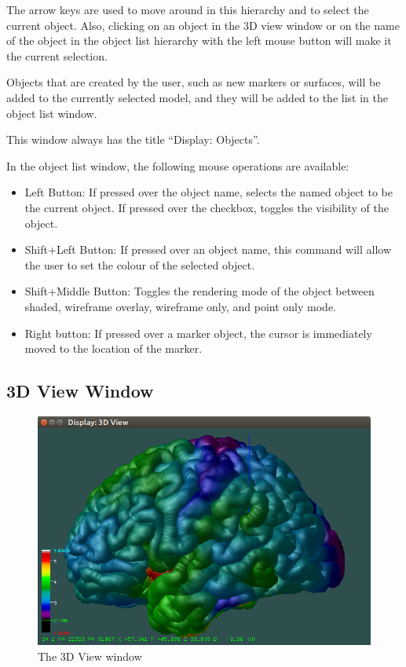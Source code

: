 \documentclass[11pt,letterpaper]{article}
\begin{document}
The arrow keys are used to move around in this hierarchy and to select
the current object. Also, clicking on an object in the 3D view window
or on the name of the object in the object list hierarchy with the
left mouse button will make it the current selection.

Objects that are created by the user, such as new markers or surfaces,
will be added to the currently selected model, and they will be added to
the list in the object list window.

This window always has the title ``Display: Objects''.

In the object list window, the following mouse operations are available:

\begin{itemize}

\item Left Button: If pressed over the object name, selects the named
  object to be the current object. If pressed over the checkbox, toggles
  the visibility of the object.
\item Shift+Left Button: If pressed over an object name, this command
  will allow the user to set the colour of the selected object.
\item Shift+Middle Button: Toggles the rendering mode of the object
  between shaded, wireframe overlay, wireframe only, and point only mode.
\item Right button: If pressed over a marker object, the cursor is
immediately moved to the location of the marker.
\end{itemize}

\subsection{3D View Window}

\begin{figure}
\centering
\includegraphics[width=0.7\linewidth]{display-3d-view.png}
\caption{The 3D View window}
\label{win3Dview}
\end{figure}
\end{document}
